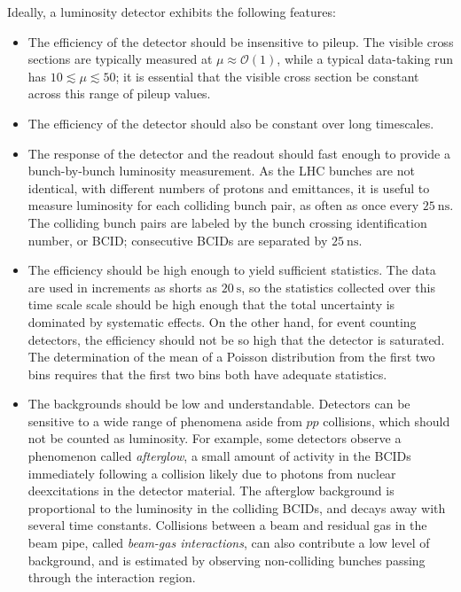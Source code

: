 Ideally, a luminosity detector exhibits the following features: 

\begin{itemize}
	\item The efficiency of the detector should be insensitive to pileup. The visible cross sections are typically measured at $\mu\approx \mathcal{O}(1)$, while a typical data-taking run has $10\lesssim\mu\lesssim50$; it is essential that the visible cross section be constant across this range of pileup values.

	\item The efficiency of the detector should also be constant over long timescales.

	\item The response of the detector and the readout should fast enough to provide a bunch-by-bunch luminosity measurement. As the LHC bunches are not identical, with different numbers of protons and emittances, it is useful to measure luminosity for each colliding bunch pair, as often as once every $\SI{25}{\nano\second}$. The colliding bunch pairs are labeled by the bunch crossing identification number, or BCID; consecutive BCIDs are separated by $\SI{25}{\nano\second}$. 

	\item The efficiency should be high enough to yield sufficient statistics. The data are used in increments as shorts as $\SI{20}{\second}$, so the statistics collected over this time scale scale should be high enough that the total uncertainty is dominated by systematic effects. On the other hand, for event counting detectors, the efficiency should not be so high that the detector is saturated. The determination of the mean of a Poisson distribution from the first two bins requires that the first two bins both have adequate statistics. 

	\item The backgrounds should be low and understandable. Detectors can be sensitive to a wide range of phenomena aside from $pp$ collisions, which should not be counted as luminosity. For example, some detectors observe a phenomenon called \emph{afterglow}, a small amount of activity in the BCIDs immediately following a collision likely due to photons from nuclear deexcitations in the detector material. The afterglow background is proportional to the luminosity in the colliding BCIDs, and decays away with several time constants. Collisions between a beam and residual gas in the beam pipe, called \emph{beam-gas interactions}, can also contribute a low level of background, and is estimated by observing non-colliding bunches passing through the interaction region.

\end{itemize}

